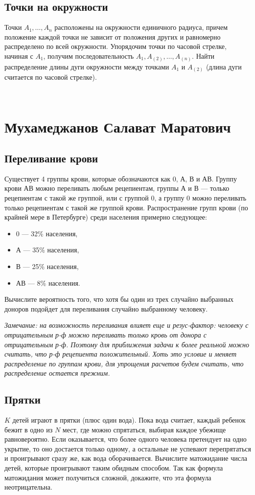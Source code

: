 \documentclass[12pt]{article}
\begin{document}
\subsection{Точки на окружности}
Точки $A_1, \dots, A_n$ расположены на окружности единичного радиуса, причем положение каждой точки не зависит от положения других и равномерно распределено по всей окружности. Упорядочим точки по часовой стрелке, начиная с $A_1$, получим последовательность $A_1, A_{(2)}, \dots, A_{(n)}$. Найти распределение длины дуги окружности между точками $A_1$ и $A_{(2)}$ (длина дуги считается по часовой стрелке).

\newpage
~
\newpage
\section{Мухамеджанов Салават Маратович}

\subsection{Переливание крови}
Существует 4 группы крови, которые обозначаются как 0, А, В и АВ. Группу крови АВ можно переливать любым рецепиентам, группы А и В --- только рецепиентам с такой же группой, или с группой 0, а группу 0 можно переливать только рецепиентам с такой же группой крови. Распространение групп крови (по крайней мере в Петербурге) среди населения примерно следующее:
\begin{itemize}
    \item 0 --- 32\% населения,
    \item А --- 35\% населения,
    \item В --- 25\% населения,
    \item АВ --- 8\% населения.
\end{itemize}
Вычислите вероятность того, что хотя бы один из трех случайно выбранных доноров подойдет для переливания случайно выбранному человеку. 

\emph{Замечание: на возможность переливания влияет еще и резус-фактор: человеку с отрицательным р-ф можно переливать только кровь от донора с отрицательным р-ф. Поэтому для приближения задачи к более реальной можно считать, что р-ф рецепиента положительный. Хоть это условие и меняет распределение по группам крови, для упрощения расчетов будем считать, что распределение остается прежним.}

\subsection{Прятки}
$K$ детей играют в прятки (плюс один вода). Пока вода считает, каждый ребенок бежит в одно из $N$ мест, где можно спрятаться, выбирая каждое убежище равновероятно. Если оказывается, что более одного человека претендует на одно укрытие, то оно достается только одному, а остальные не успевают перепрятаться и проигрывают сразу же, как вода оборачивается. Вычислите матожидание числа детей, которые проигрывают таким обидным способом. Так как формула матожидания может получиться сложной, докажите, что эта формула неотрицательна.
\end{document}
